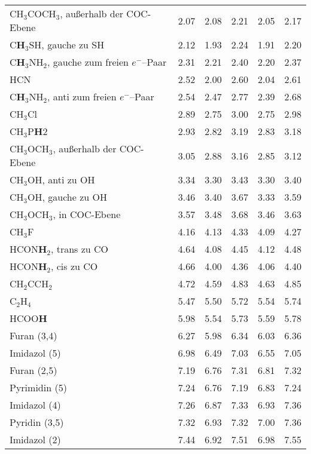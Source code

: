 \begin{table}[ht!]
{\begin{tabular}{lr|rr|rr}
    CH$_{3}$COCH$_{3}$, außerhalb der COC-Ebene & 2.07  & 2.08  & 2.21  & 2.05  & 2.17 \\
    C\textbf{H}$_{3}$SH, gauche zu SH & 2.12  & 1.93  & 2.24  & 1.91  & 2.20 \\
    C\textbf{H}$_{3}$NH$_{2}$, gauche zum freien $e^-$--Paar & 2.31  & 2.21  & 2.40   & 2.20   & 2.37 \\
    HCN   & 2.52  & 2.00     & 2.60   & 2.04  & 2.61 \\
    C\textbf{H}$_{3}$NH$_{2}$, anti zum freien $e^-$--Paar & 2.54  & 2.47  & 2.77  & 2.39  & 2.68 \\
    CH$_{3}$Cl & 2.89  & 2.75  & 3.00     & 2.75  & 2.98 \\
    CH$_{3}$P\textbf{H}2 & 2.93  & 2.82  & 3.19  & 2.83  & 3.18 \\
    CH$_{3}$OCH$_{3}$, außerhalb der COC-Ebene & 3.05  & 2.88  & 3.16  & 2.85  & 3.12 \\
    CH$_{3}$OH, anti zu OH & 3.34  & 3.30   & 3.43  & 3.30   & 3.40 \\
    CH$_{3}$OH, gauche zu OH & 3.46  & 3.40   & 3.67  & 3.33  & 3.59 \\
    CH$_{3}$OCH$_{3}$, in COC-Ebene & 3.57  & 3.48  & 3.68  & 3.46  & 3.63 \\
    CH$_{3}$F  & 4.16  & 4.13  & 4.33  & 4.09  & 4.27 \\
    HCON\textbf{H}$_{2}$, trans zu CO & 4.64  & 4.08  & 4.45  & 4.12  & 4.48 \\
    HCON\textbf{H}$_{2}$, cis zu CO & 4.66  & 4.00     & 4.36  & 4.06  & 4.40 \\
    CH$_{2}$CCH$_{2}$ & 4.72  & 4.59  & 4.83  & 4.63  & 4.85 \\
    C$_{2}$H$_{4}$  & 5.47  & 5.50   & 5.72  & 5.54  & 5.74 \\
    HCOO\textbf{H} & 5.98  & 5.54  & 5.73  & 5.59  & 5.78 \\
    Furan (3,4) & 6.27  & 5.98  & 6.34  & 6.03  & 6.36 \\
    Imidazol (5) & 6.98  & 6.49  & 7.03  & 6.55  & 7.05 \\
    Furan (2,5) & 7.19  & 6.76  & 7.31  & 6.81  & 7.32 \\
    Pyrimidin (5) & 7.24  & 6.76  & 7.19  & 6.83  & 7.24 \\
    Imidazol (4) & 7.26  & 6.87  & 7.33  & 6.93  & 7.36 \\
    Pyridin (3,5) & 7.32  & 6.93  & 7.32  & 7.00 & 7.36 \\
    Imidazol (2) & 7.44  & 6.92  & 7.51  & 6.98  & 7.55 \\

\end{tabular}}
\end{table}

